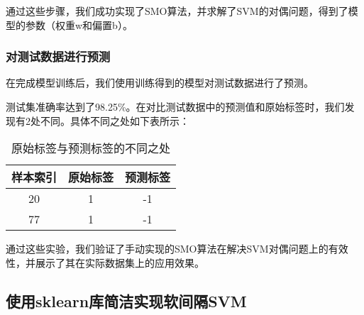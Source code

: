 \documentclass[12pt]{article}
\begin{document}
通过这些步骤，我们成功实现了SMO算法，并求解了SVM的对偶问题，得到了模型的参数（权重w和偏置b）。

\subsubsection{对测试数据进行预测}

在完成模型训练后，我们使用训练得到的模型对测试数据进行了预测。




测试集准确率达到了98.25\%。在对比测试数据中的预测值和原始标签时，我们发现有2处不同。具体不同之处如下表所示：

\begin{table}[h]
  \centering
  \begin{tabular}{ccc}
    \toprule
    样本索引 & 原始标签 & 预测标签 \\
    \midrule
    20 & 1 & -1 \\
    77 & 1 & -1 \\
    \bottomrule
  \end{tabular}
  \caption{原始标签与预测标签的不同之处}
\end{table}

通过这些实验，我们验证了手动实现的SMO算法在解决SVM对偶问题上的有效性，并展示了其在实际数据集上的应用效果。


\subsection{使用sklearn库简洁实现软间隔SVM}
\end{document}
